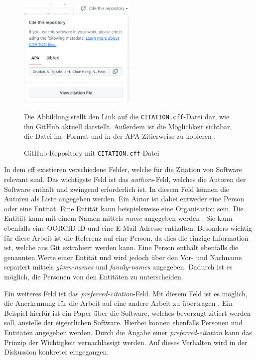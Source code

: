 \begin{figure}
    \begin{center}
      \includegraphics[width=0.5\textwidth]{bilder/GH_CFF_link.png}
    \end{center}
    \caption{GitHub-Repository mit \texttt{CITATION.cff}-Datei}
    \label{fig:gh_cff_link}
    \small
    Die Abbildung stellt den Link auf die \texttt{CITATION.cff}-Datei dar, wie ihn GitHub aktuell darstellt.
    Außerdem ist die Möglichkeit sichtbar, die Datei im -Format und in der APA-Zitierweise zu kopieren \autocite{druskat_citation_2021-1}.
\end{figure}

In dem \gls{cff} existieren verschiedene Felder, welche für die Zitation von Software relevant sind.
Das wichtigste Feld ist das \emph{authors}-Feld, welches die Autoren der Software enthält und zwingend erforderlich ist.
In diesem Feld können die Autoren als Liste angegeben werden.
Ein Autor ist dabei entweder eine Person oder eine Entität.
Eine Entität kann beispielsweise eine Organisation sein.
Die Entität kann mit einem Namen mittels \emph{name} angegeben werden \autocite{druskat_citation_2021}.
Sie kann ebenfalls eine OORCID iD und eine E-Mail-Adresse enthalten.
Besonders wichtig für diese Arbeit ist die Referenz auf eine Person, da dies die einzige Information ist, welche aus Git extrahiert werden kann.
Eine Person enthält ebenfalls die genannten Werte einer Entität und wird jedoch über den Vor- und Nachname separiert mittels \emph{given-names} und \emph{family-names} angegeben.
Dadurch ist es möglich, die Personen von den Entitäten zu unterscheiden.

Ein weiteres Feld ist das \emph{preferred-citation}-Feld.
Mit diesem Feld ist es möglich, die Anerkennung für die Arbeit auf eine andere Arbeit zu übertragen \autocite{druskat_citation_2021}.
Ein Beispiel hierfür ist ein Paper über die Software, welches bevorzugt zitiert werden soll, anstelle der eigentlichen Software.
Hierbei können ebenfalls Personen und Entitäten angegeben werden.
Durch die Angabe einer \emph{preferred-citation} kann das Prinzip der Wichtigkeit vernachlässigt werden.
Auf dieses Verhalten wird in der Diskussion konkreter eingegangen.

